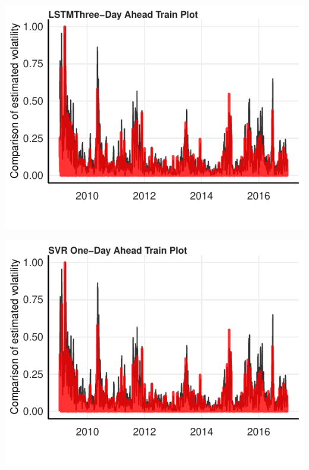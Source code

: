 \documentclass[11pt,preprint, authoryear]{elsarticle}
\let\origfigure\figure
\let\endorigfigure\endfigure
\renewenvironment{figure}[1][2] {
    \expandafter\origfigure\expandafter[H]
} {
    \endorigfigure
}
\numberwithin{equation}{section}
\numberwithin{figure}{section}
\numberwithin{table}{section}
\begin{document}
\begin{figure}[H]

{\centering \includegraphics{Essay_files/figure-latex/plot_4-1} 

}

\caption{LSTM Three-Day Ahead Training Forecast}\label{fig:plot_4}
\end{figure}

\begin{figure}[H]

{\centering \includegraphics{Essay_files/figure-latex/plot_5-1} 

}

\caption{SVR One-Day Ahead Training Forecast}\label{fig:plot_5}
\end{figure}
\end{document}
